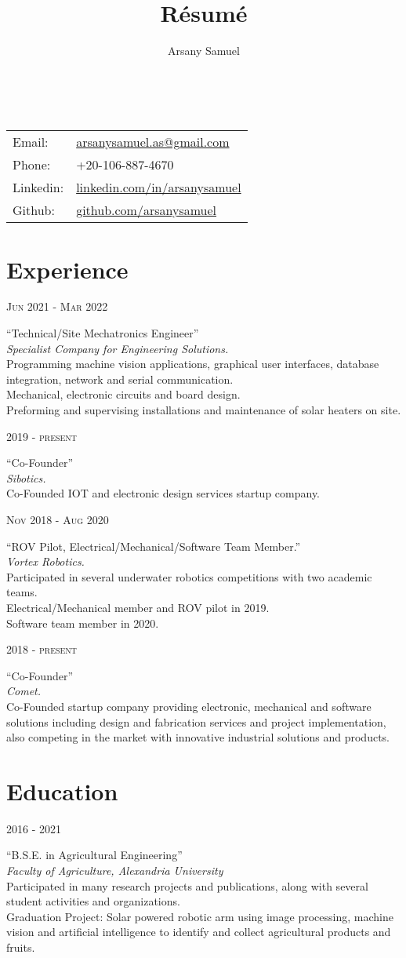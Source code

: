 \documentclass[a4paper]{article}
\title{R\'esum\'e}
\author{Arsany Samuel}
\makeatletter
\renewcommand{\maketitle}{
	\begin{center}
		{\Huge\bfseries{\theauthor}}\\
			\vspace{0.5em}
		{
			\begin{center}
				\large\begin{tabular}{l  l}
					Email: & \href{mailto:arsanysamuel.as@gmail.com}{arsanysamuel.as@gmail.com}  \\ 
					Phone: & +20-106-887-4670  \\
					Linkedin: & \url{linkedin.com/in/arsanysamuel}  \\
					Github: & \url{github.com/arsanysamuel}
				\end{tabular}
			\end{center}
		}
	\end{center}
}
\newcommand{\ag}{Agricultural Engineering}
\newcommand{\foa}{Faculty of Agriculture}
\newcommand{\au}{Alexandria University}
\newcommand{\entry}[4]{   %
	\begin{center}
		\begin{minipage}[c]{0.25\linewidth}  %
			\vfill
			\hfill  %
			\textsc{#1}  %
			\vfill
		\end{minipage}
		\hfill\vline\hfill  %
		\begin{minipage}[c]{0.7\linewidth}
			\textrm{``#2''} \\
			\textit{#3} \\
			\footnotesize{#4}
		\end{minipage}
	\end{center}
}
\makeatother
\begin{document}
	\maketitle
	


	\section{Experience}
		\entry{Jun 2021 - Mar 2022}
			{Technical/Site Mechatronics Engineer}
			{Specialist Company for Engineering Solutions.}
			{Programming machine vision applications, graphical user interfaces, database integration, network and serial communication.\\Mechanical, electronic circuits and board design.\\Preforming and supervising installations and maintenance of solar heaters on site.}
		\entry{2019 - present}
			{Co-Founder}
			{Sibotics.}
			{Co-Founded IOT and electronic design services startup company.}
		\entry{Nov 2018 - Aug 2020}
			{ROV Pilot, Electrical/Mechanical/Software Team Member.}
			{Vortex Robotics.}
			{Participated in several underwater robotics competitions with two academic teams.\\Electrical/Mechanical member and ROV pilot in 2019.\\Software team member in 2020.}
		\entry{2018 - present}  %
			{Co-Founder}
			{Comet.}
			{Co-Founded startup company providing electronic, mechanical and software solutions including design and fabrication services and project implementation, also competing in the market with innovative industrial solutions and products.}

	\section{Education}
		\entry{2016 - 2021}
			{B.S.E. in \ag}
			{\foa, \au }
			{
				Participated in many research projects and publications, along with several student activities and organizations.\\
				Graduation Project: Solar powered robotic arm using image processing, machine vision and artificial intelligence to identify and collect agricultural products and fruits.
			}
\end{document}
